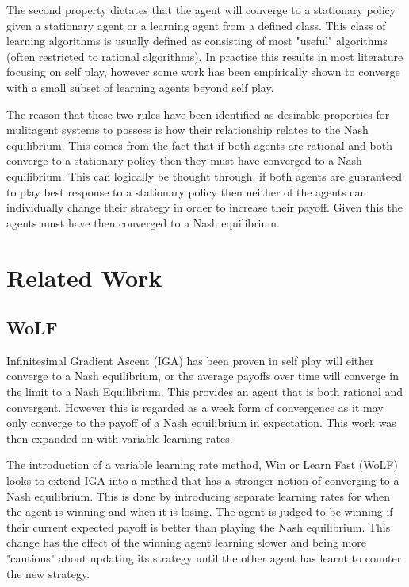 \documentclass{article}
\begin{document}
The second property dictates that the agent will converge to a stationary policy given 
a stationary agent or a learning agent from a defined class. This class of learning
algorithms is usually defined as consisting of most "useful" algorithms (often restricted
to rational algorithms). In practise this results in most literature focusing on self 
play, however some work has been empirically shown to converge with a small subset of learning 
agents beyond self play. 

The reason that these two rules have been identified as desirable properties for mulitagent
systems to possess is how their relationship relates to the Nash equilibrium. This comes from 
the fact that if both agents are rational and both converge to a stationary policy then they
must have converged to a Nash equilibrium. This can logically be thought through, if both 
agents are guaranteed to play best response to a stationary policy then neither of the agents 
can individually change their strategy in order to increase their payoff. Given this the agents 
must have then converged to a Nash equilibrium.

\section{Related Work}

\subsection{WoLF}

Infinitesimal Gradient Ascent (IGA) has been proven in self play will either converge to a Nash equilibrium,
or the average payoffs over time will converge in the limit to a Nash Equilibrium. This provides an agent
that is both rational and convergent. However this is regarded as a week form of convergence as it may only
converge to the payoff of a Nash equilibrium in expectation. This work was then expanded on with variable
learning rates.

The introduction of a variable learning rate method, Win or Learn Fast (WoLF) looks to extend IGA into a
method that has a stronger notion of converging to a Nash equilibrium. This is done by introducing separate
learning rates for when the agent is winning and when it is losing. The agent is judged to be winning if their
current expected payoff is better than playing the Nash equilibrium. This change has the effect of the winning
agent learning slower and being more "cautious" about updating its strategy until the other agent has learnt 
to counter the new strategy.
\end{document}
